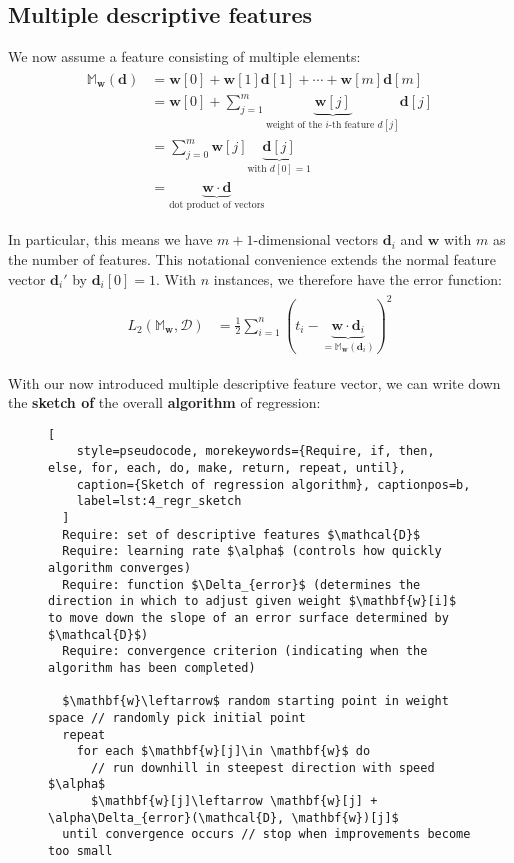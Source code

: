 \subsection{Multiple descriptive features}

We now assume a feature consisting of multiple elements:
\begin{align*}\begin{aligned}
  \mathbb{M}_\mathbf{w}(\mathbf{d}) &= \mathbf{w}[0] + \mathbf{w}[1]\mathbf{d}[1] + \cdots + \mathbf{w}[m]\mathbf{d}[m]\\
  &= \mathbf{w}[0] + \sum_{j=1}^m \underbrace{\mathbf{w}[j]}_{\text{weight of the }i\text{-th feature }d[j]}\mathbf{d}[j]\\
  &= \sum_{j=0}^m \mathbf{w}[j]\underbrace{\mathbf{d}[j]}_{\text{with }d[0] = 1}\\
  &= \underbrace{\mathbf{w}\cdot\mathbf{d}}_{\text{dot product of vectors}}
\end{aligned}\end{align*}

In particular, this means we have $m+1$-dimensional vectors $\mathbf{d}_i$ and $\mathbf{w}$ with $m$ as the number of features. This notational convenience extends the normal feature vector $\mathbf{d}_i'$ by $\mathbf{d}_i[0] = 1$. With $n$ instances, we therefore have the error function:
\begin{align*}\begin{aligned}
  L_2(\mathbb{M}_\mathbf{w}, \mathcal{D}) &= \frac{1}{2}\sum_{i=1}^n (t_i - \underbrace{\mathbf{w}\cdot\mathbf{d}_i}_{= \mathbb{M}_\mathbf{w}(\mathbf{d}_i)})^2
\end{aligned}\end{align*}

With our now introduced multiple descriptive feature vector, we can write down the \textbf{sketch of} the overall \textbf{algorithm} of regression:
\begin{figure}[h]
  \begin{lstlisting}[
    style=pseudocode, morekeywords={Require, if, then, else, for, each, do, make, return, repeat, until},
    caption={Sketch of regression algorithm}, captionpos=b,
    label=lst:4_regr_sketch
  ]
  Require: set of descriptive features $\mathcal{D}$
  Require: learning rate $\alpha$ (controls how quickly algorithm converges)
  Require: function $\Delta_{error}$ (determines the direction in which to adjust given weight $\mathbf{w}[i]$ to move down the slope of an error surface determined by $\mathcal{D}$)
  Require: convergence criterion (indicating when the algorithm has been completed)
  
  $\mathbf{w}\leftarrow$ random starting point in weight space // randomly pick initial point
  repeat
    for each $\mathbf{w}[j]\in \mathbf{w}$ do
      // run downhill in steepest direction with speed $\alpha$
      $\mathbf{w}[j]\leftarrow \mathbf{w}[j] + \alpha\Delta_{error}(\mathcal{D}, \mathbf{w})[j]$
  until convergence occurs // stop when improvements become too small
  \end{lstlisting}
\end{figure}

